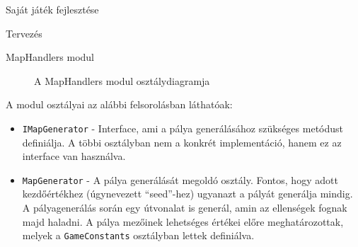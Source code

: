 \begin{MyChapter}{Saját játék fejlesztése}
\begin{MySection}{Tervezés}
\begin{MySubSection}{MapHandlers modul}
			\begin{figure}[h!]
				\centering
				\caption{A MapHandlers modul osztálydiagramja}
				\label{fig:uml:map}
			\end{figure}
			
			A modul osztályai az alábbi felsorolásban láthatóak:
			\begin{itemize}
				\item \texttt{IMapGenerator} - Interface, ami a pálya generálásához szükséges metódust definiálja. A többi osztályban nem a konkrét implementáció, hanem ez az interface van használva.
				
				\item \texttt{MapGenerator} - A pálya generálását megoldó osztály. Fontos, hogy adott kezdőértékhez (úgynevezett ``seed''-hez) ugyanazt a pályát generálja mindig. A pályagenerálás során egy útvonalat is generál, amin az ellenségek fognak majd haladni. A pálya mezőinek lehetséges értékei előre meghatározottak, melyek a \texttt{GameConstants} osztályban lettek definiálva.
				

\end{itemize}
\end{MySubSection}
\end{MySection}
\end{MyChapter}
